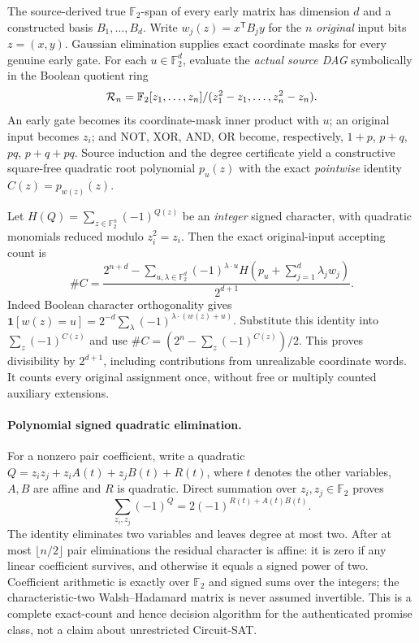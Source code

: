 \documentclass[11pt]{article}
\begin{document}
The source-derived true $\mathbb F_2$-span of every early matrix has dimension
$d$ and a constructed basis $B_1,\ldots,B_d$.
Write $w_j(z)=x^{\mathsf T}B_jy$ for the $n$ \emph{original} input bits
$z=(x,y)$.  Gaussian elimination supplies exact coordinate masks for
every genuine early gate.  For each $u\in\mathbb F_2^d$, evaluate the
\emph{actual source DAG} symbolically in the Boolean quotient ring
\[
{\cal R}_n=\mathbb F_2[z_1,\ldots,z_n]/
 (z_1^2-z_1,\ldots,z_n^2-z_n).
\]
An early gate becomes its coordinate-mask inner product with $u$;
an original input becomes $z_i$; and NOT, XOR, AND, OR become,
respectively, $1+p$, $p+q$, $pq$, $p+q+pq$.
Source induction and the degree certificate yield a constructive
square-free quadratic root polynomial $p_u(z)$ with the exact
\emph{pointwise} identity $C(z)=p_{w(z)}(z)$.

Let $H(Q)=\sum_{z\in\mathbb F_2^n}(-1)^{Q(z)}$ be an
\emph{integer} signed character, with quadratic monomials reduced
modulo $z_i^2=z_i$.  Then the exact original-input accepting count is
\[
\boxed{
\# C=
\frac{2^{n+d}-
 \displaystyle\sum_{u,\lambda\in\mathbb F_2^d}
 (-1)^{\lambda\cdot u}
 H\left(p_u+\sum_{j=1}^d\lambda_j w_j\right)}
 {2^{d+1}}.}
\]
Indeed Boolean character orthogonality gives
$\mathbf1[w(z)=u]=2^{-d}
 \sum_\lambda(-1)^{\lambda\cdot(w(z)+u)}$.
Substitute this identity into $\sum_z(-1)^{C(z)}$ and use
$\#C=(2^n-\sum_z(-1)^{C(z)})/2$.
This proves divisibility by $2^{d+1}$, including contributions from
unrealizable coordinate words.  It counts every original assignment
once, without free or multiply counted auxiliary extensions.

\paragraph{Polynomial signed quadratic elimination.}
For a nonzero pair coefficient, write a quadratic
$Q=z_i z_j+z_iA(t)+z_jB(t)+R(t)$, where $t$ denotes the other
variables, $A,B$ are affine and $R$ is quadratic.  Direct summation
over $z_i,z_j\in\mathbb F_2$ proves
\[
\sum_{z_i,z_j}(-1)^Q=2(-1)^{R(t)+A(t)B(t)}.
\]
The identity eliminates two variables and leaves degree at most two.
After at most $\lfloor n/2\rfloor$ pair eliminations the residual
character is affine: it is zero if any linear coefficient survives,
and otherwise it equals a signed power of two.  Coefficient arithmetic
is exactly over $\mathbb F_2$ and signed sums over the integers;
the characteristic-two Walsh--Hadamard matrix is never assumed
invertible.  This is a complete exact-count and hence decision
algorithm for the authenticated promise class, not a claim about
unrestricted Circuit-SAT.
\end{document}
